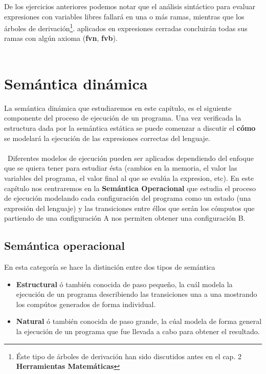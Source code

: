     \bigskip

    De los ejercicios anteriores podemos notar que el análisis sintáctico para evaluar  expresiones con variables libres fallará en una o más ramas, mientras que los árboles de derivación\footnote{Éste tipo de árboles de derivación han sido discutidos antes en el cap. 2 \textbf{Herramientas Matemáticas}}. aplicados en expresiones cerradas concluirán todas sus ramas con algún axioma (\textbf{fvn}, \textbf{fvb}). \\\\

    \section{Semántica dinámica}
    La semántica dinámica que estudiaremos en este capítulo, es el siguiente componente del proceso de ejecución de un programa. Una vez verificada la estructura dada por la semántica estática se puede comenzar a discutir el \textbf{cómo} se modelará la ejecución de las expresiones correctas del lenguaje. \\\\\
    Diferentes modelos de ejecución pueden ser aplicados dependiendo del enfoque que se quiera tener para estudiar ésta (cambios en la memoria, el valor las variables del programa, el valor final al que se evalúa la expresion, etc). En este capítulo nos centraremos en la \textbf{Semántica Operacional} que estudia el proceso de ejecución modelando cada configuración del programa como un estado (una expresión del lenguaje) y las transiciones entre éllos que serán los cómputos que partiendo de una configuración A nos permiten obtener una configuración B.
    
    
    \subsection{Semántica operacional}
    En esta categoría se hace la distinción entre dos tipos de semántica
    \begin{itemize}
        \item \textbf{Estructural} ó también conocida de paso pequeño, la cuál modela la ejecución de un programa describiendo las transiciones una a una mostrando los compútos generados de forma individual. 
        \item \textbf{Natural} ó también conocida de paso grande, la cúal modela de forma general la ejecución de un programa que fue llevada a cabo para obtener el resultado.
    \end{itemize}

